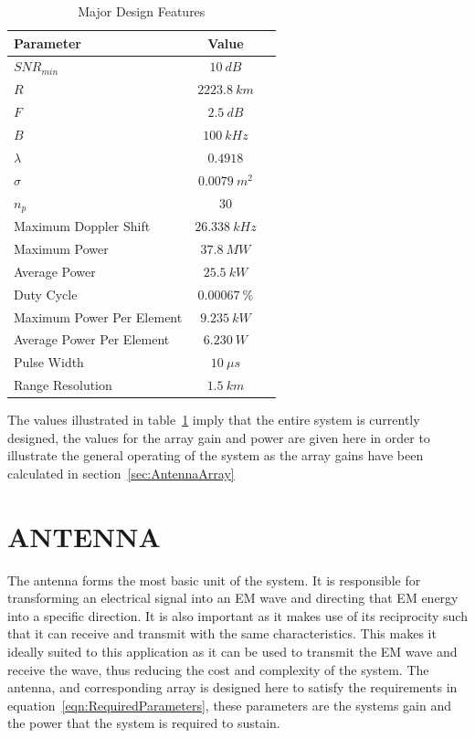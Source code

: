 \documentclass[11pt]{witseiepaper}
\begin{document}
\begin{bibunit}[witseie]
\begin{table}[htb]
    \caption{Major Design Features}
    \label{tab:DesignValues}
    \begin{center}
        \begin{tabular}{p{70mm}cp{70mm}}
            \hline 
            Parameter & Value \\
            \hline
            $SNR_{min}$ & $10~dB$ \\
            $R$ & $2223.8~km$ \\
            $F$ & $2.5~dB$ \\
            $B$ & $100~kHz$ \\
            $\lambda$ & $0.4918$ \\
            $\sigma$ & $0.0079~m^2$ \\
            $n_p$ & $30$ \\
            Maximum Doppler Shift & $26.338~kHz$ \\
            Maximum Power & $37.8~MW$ \\
            Average Power & $25.5~kW$ \\
            Duty Cycle & $0.00067~\%$ \\
            Maximum Power Per Element & $9.235~kW$ \\
            Average Power Per Element & $6.230~W$ \\
            Pulse Width & $10~\mu s$ \\
            Range Resolution & $1.5~km$ \\
            \hline
        \end{tabular}
    \end{center}
\end{table}
The values illustrated in table~\ref{tab:DesignValues} imply that the entire system is currently designed, the values for the array gain and power are given here in order to illustrate the general operating of the system as the array gains have been calculated in section~\ref{sec:AntennaArray}
% 
\section{ANTENNA} \label{sec:Antenna}
The antenna forms the most basic unit of the system. It is responsible for transforming an electrical signal into an EM wave and directing that EM energy into a specific direction. It is also important as it makes use of its reciprocity such that it can receive and transmit with the same characteristics. This makes it ideally suited to this application as it can be used to transmit the EM wave and receive the wave, thus reducing the cost and complexity of the system.
The antenna, and corresponding array is designed here to satisfy the requirements in equation~\ref{eqn:RequiredParameters}, these parameters are the systems gain and the power that the system is required to sustain.


\end{bibunit}
\end{document}
